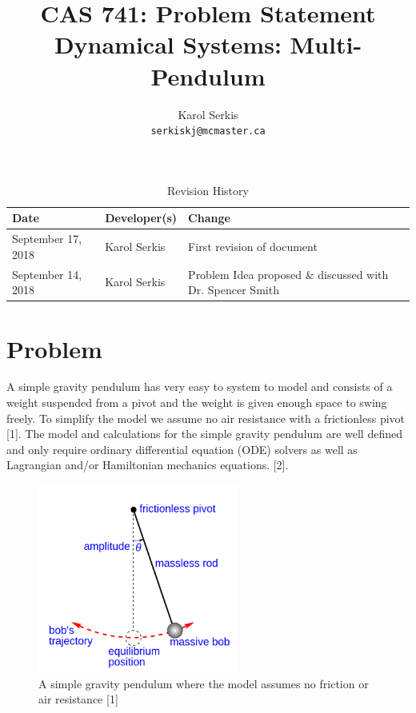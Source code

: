 \documentclass{article}
\title{CAS 741: Problem Statement\\[10pt]\Large Dynamical Systems: Multi-Pendulum }
\author{Karol Serkis\\\texttt{serkiskj@mcmaster.ca}}
\date{}
\begin{document}

\maketitle

\begin{table}[hp]
\caption{Revision History} \label{TblRevisionHistory}
\begin{tabularx}{\textwidth}{llX}
\toprule
\textbf{Date} & \textbf{Developer(s)} & \textbf{Change}\\
\midrule
September 17, 2018 & Karol Serkis & First revision of document\\
September 14, 2018 & Karol Serkis & Problem Idea proposed \& discussed with Dr.
Spencer Smith \\
\bottomrule
\end{tabularx}
\end{table}


\section*{Problem}


A simple gravity pendulum has very easy to system to model and consists of a
weight suspended from a pivot and the weight is given enough space to swing
freely. To simplify the model we assume no air resistance with a frictionless
pivot [1]. The model and calculations for the simple gravity pendulum are well
defined and only require ordinary differential equation (ODE) solvers as well as 
Lagrangian and/or Hamiltonian mechanics equations.
[2]. 
\begin{figure}[H]
	\centering
	\includegraphics[width=250px]{simple-pend.png}
\caption{A simple gravity pendulum where the model assumes no friction or air
resistance [1]}
	\label{fig:simplepend}
\end{figure}
\end{document}
